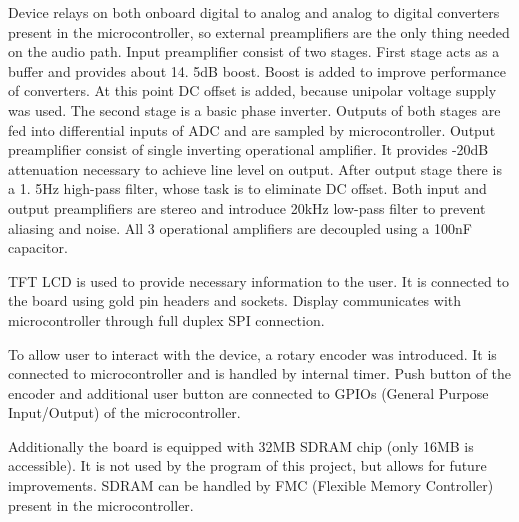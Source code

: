 \documentclass{article}
\begin{document}
Device relays on both onboard digital to analog and analog to digital converters present in the microcontroller, so external preamplifiers are the only thing needed on the audio path.
Input preamplifier consist of two stages.
First stage acts as a buffer and provides about 14.
5dB boost.
Boost is added to improve performance of converters.
At this point DC offset is added, because unipolar voltage supply was used.
The second stage is a basic phase inverter.
Outputs of both stages are fed into differential inputs of ADC and are sampled by microcontroller.
Output preamplifier consist of single inverting operational amplifier.
It provides -20dB attenuation necessary to achieve line level on output.
After output stage there is a 1.
5Hz high-pass filter, whose task is to eliminate DC offset.
Both input and output preamplifiers are stereo and introduce 20kHz low-pass filter to prevent aliasing and noise.
All 3 operational amplifiers are decoupled using a 100nF capacitor.

TFT LCD is used to provide necessary information to the user.
It is connected to the board using gold pin headers and sockets.
Display communicates with microcontroller through full duplex SPI connection.

To allow user to interact with the device, a rotary encoder was introduced.
It is connected to microcontroller and is handled by internal timer.
Push button of the encoder and additional user button are connected to GPIOs (General Purpose Input/Output) of the microcontroller.

Additionally  the board is equipped with 32MB SDRAM chip (only 16MB is accessible).
It is not used by the program of this project, but allows for future improvements.
SDRAM can be handled by FMC (Flexible Memory Controller) present in the microcontroller.
\newpage
\end{document}
